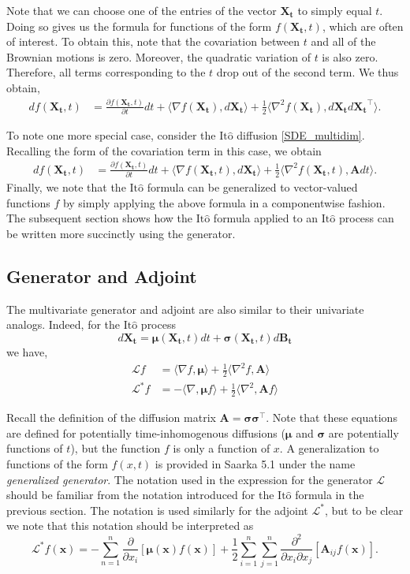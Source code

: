 \documentclass[12pt]{article}
\newcommand{\B}[1]{\boldsymbol{#1}}
\newcommand{\bx}{\mathbf{x}}
\newcommand{\state}[1][t]{X_{#1}}
\newcommand{\BM}[1][t]{B_{#1}} %
\newcommand{\gen}{\mathcal{L}} %
\newcommand{\ito}{\text{It}\hat{\text{o}}}
\newcommand{\dimState}{n}
\newcommand{\diffMat}{\mathbf{A}} %
\begin{document}
Note that we can choose one of the entries of the vector $\B\state$ to simply equal $t$. Doing so gives us the formula for functions of the form $f(\B\state, t)$, which are 
often of interest. To obtain this, note that the covariation between $t$ and all of the Brownian motions is zero. Moreover, the quadratic variation of $t$ is also zero. Therefore, 
all terms corresponding to the $t$ drop out of the second term. We thus obtain, 
\begin{align*}
df(\B\state, t) &= \frac{\partial f(\B\state,t)}{\partial t}dt  + \langle \nabla f(\B\state), d\B\state \rangle + \frac{1}{2} \langle \nabla^2 f(\B\state), d\B\state d\B\state^\top  \rangle.
\end{align*}

To note one more special case, consider the $\ito$ diffusion \ref{SDE_multidim}. Recalling the form of the covariation term in this case, we obtain 
\begin{align*}
df(\B\state, t) &= \frac{\partial f(\B\state,t)}{\partial t}dt + \langle \nabla f(\B\state,t), d\B\state \rangle + \frac{1}{2} \langle \nabla^2 f(\B\state,t), \diffMat dt  \rangle.
\end{align*}
Finally, we note that the $\ito$ formula can be generalized to vector-valued functions $f$ by simply applying the above formula in a componentwise fashion. The subsequent 
section shows how the $\ito$ formula applied to an $\ito$ process can be written more succinctly using the generator. 

\subsection{Generator and Adjoint}
The multivariate generator and adjoint are also similar to their univariate analogs. Indeed, for the $\ito$ process 
\[
d\B\state = \B\mu(\B\state,t) dt + \B\sigma(\B\state,t) d\B\BM
\]
we have,
\begin{align*}
\gen f &= \langle \nabla f, \B\mu \rangle + \frac{1}{2} \langle \nabla^2 f, \diffMat \rangle \\
\gen^* f &= -\langle \nabla, \B\mu f \rangle + \frac{1}{2} \langle \nabla^2, \diffMat f\rangle
\end{align*}

Recall the definition of the diffusion matrix $\diffMat = \B\sigma \B\sigma^\top$. Note that these equations are defined for potentially time-inhomogenous diffusions 
($\B\mu$ and $\B\sigma$ are potentially functions of $t$), but the function $f$ is only a function of $x$. A generalization to functions of the form 
$f(x,t)$ is provided in Saarka 5.1 under the name \textit{generalized generator}. The notation used in the expression for the generator $\gen$ should be familiar from 
the notation introduced for the $\ito$ formula in the previous section. The notation is used similarly for the adjoint $\gen^*$, but to be clear we note that this notation 
should be interpreted as 
\[
\gen^* f(\B{x}) = -\sum_{n=1}^{\dimState} \frac{\partial}{\partial x_i}\left[\B\mu(\B{x})f(\B{x}) \right] + \frac{1}{2} \sum_{i=1}^{\dimState}\sum_{j=1}^{\dimState} \frac{\partial^2}{\partial x_i \partial x_j}\left[\diffMat_{ij}f(\bx) \right].
\]
\end{document}
